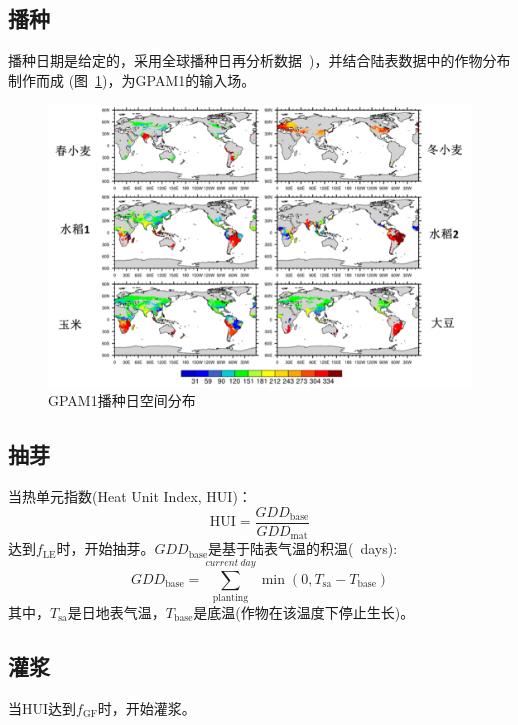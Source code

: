 \subsection{播种}\label{sec:播种}
  播种日期是给定的，采用全球播种日再分析数据~\citep{jagermeyr2021climate})，并结合陆表数据中的作物分布制作而成 (图~\ref{fig:GPAM1播种日空间分布})，为GPAM1的输入场。

{
\begin{figure}[htbp]
\centering
\includegraphics[scale=1.2]{Figures/作物模式/GPAM1播种日空间分布.png}
\caption{GPAM1播种日空间分布}
\label{fig:GPAM1播种日空间分布}
\end{figure}
}

\subsection{抽芽}
  当热单元指数(Heat Unit Index, ${\mathrm {HUI}}$)：
  \begin{equation}\label{HUI}
  {\mathrm {HUI}}=\frac{GDD_{\mathrm{base}}}{GDD_{\mathrm{mat}}}
  \end{equation}
  达到$f_{\mathrm{LE}}$时，开始抽芽。$GDD_{\mathrm{base}}$是基于陆表气温的积温(\textcelsius\ days):
  \begin{equation}
  GDD_{\mathrm{ {base }}}=\sum_{\mathrm{planting}}^{current\ day} \min \left(0, T_{\mathrm{sa}}-T_{\mathrm{base}}\right)
  \end{equation}
 其中，$T_{\mathrm{sa}}$是日地表气温，$T_{\mathrm{base}}$是底温(作物在该温度下停止生长)。

\subsection{灌浆}
  当${\mathrm {HUI}}$达到$f_{\mathrm{GF}}$时，开始灌浆。

